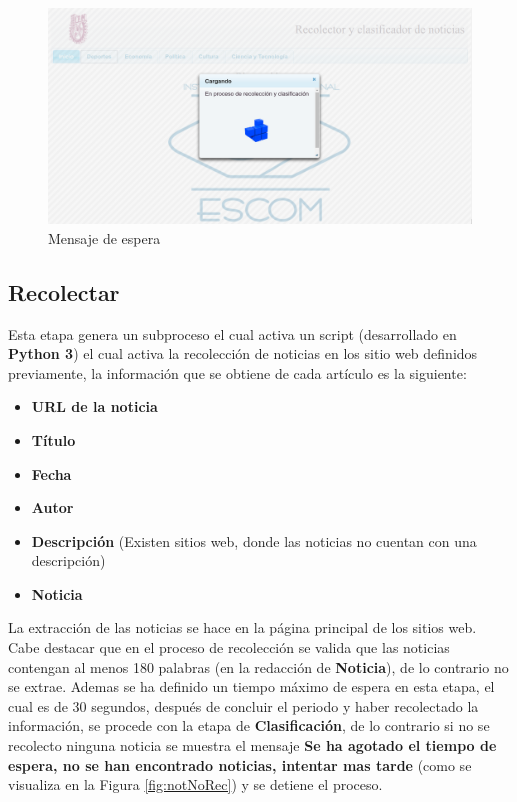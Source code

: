 \begin{figure}[H]
\centering
\includegraphics[scale=0.35]{imagenes/mensajeEspera.png}
\caption{Mensaje de espera}
\label{fig:loading}
\end{figure}


\subsection{Recolectar}


Esta etapa genera un subproceso el cual activa un script (desarrollado en \textbf{Python 3}) el cual activa la recolección de noticias en los sitio web definidos previamente, la información que se obtiene de cada artículo es la siguiente:

\begin{itemize}
	\item \textbf{URL de la noticia}
	\item \textbf{Título}
	\item \textbf{Fecha}
	\item \textbf{Autor}
	\item \textbf{Descripción} (Existen sitios web, donde las noticias no cuentan con una descripción)
	\item \textbf{Noticia}
\end{itemize}

La extracción de las noticias se hace en la página principal de los sitios web. Cabe destacar que en el proceso de recolección se valida que las noticias contengan al menos 180 palabras (en la redacción de \textbf{Noticia}), de lo contrario no se extrae. Ademas se ha definido un tiempo máximo de espera en esta etapa, el cual es de 30 segundos, después de concluir el periodo y haber recolectado la información, se procede con la etapa de \textbf{Clasificación}, de lo contrario si no se recolecto ninguna noticia se muestra el mensaje \textbf{Se ha agotado el tiempo de espera, no se han encontrado noticias, intentar mas tarde} (como se visualiza en la Figura \ref{fig:notNoRec}) y se detiene el proceso.

